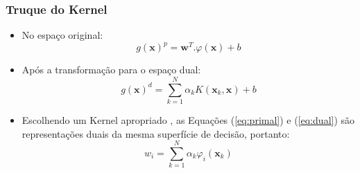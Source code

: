 \documentclass{beamer}
\begin{document}
\begin{frame}
	\frametitle{Truque do Kernel}
	\begin{itemize}
		\item No espaço original:
		\begin{equation}
	 		g(\textbf{x})^p = \textbf{w}^T.\varphi(\textbf{x}) + b
	 		\label{eq:primal}
		\end{equation}
		\item Após a transformação para o espaço dual:
		\begin{equation}
			g(\textbf{x})^d = \sum_{k=1}^{N} \alpha_kK(\textbf{x}_k,\textbf{x}) + b
	 		\label{eq:dual}
		\end{equation}
		\item Escolhendo um Kernel apropriado \cite{mercer}, as Equações (\ref{eq:primal}) e (\ref{eq:dual}) são representações duais da mesma superfície de decisão, portanto:
		\begin{equation}
		 	w_i = \sum_{k=1}^{N} \alpha_k\varphi_i(\textbf{x}_k)
			\label{eq:rela}
		\end{equation}
	\end{itemize}
\end{frame}
\end{document}
